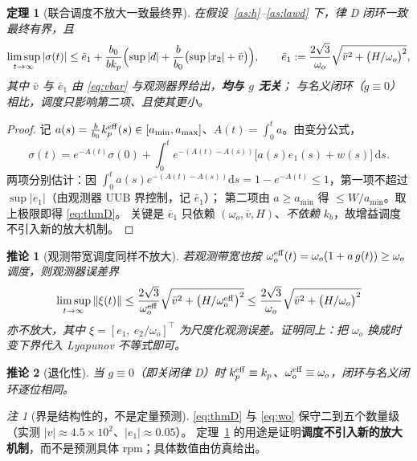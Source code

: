 \documentclass[11pt,a4paper]{article}
\newtheorem{theorem}{定理}
\newtheorem{corollary}{推论}
\theoremstyle{remark}
\newtheorem{remark}{注}
\begin{document}
\begin{theorem}[联合调度不放大一致最终界]\label{thm:lawd}
在假设~\ref{as:h}--\ref{as:lawd} 下，律 D 闭环一致最终有界，且
\begin{equation}
\limsup_{t\to\infty}|\sigma(t)|\le \bar e_1+\frac{b_0}{b k_p}\Bigl(\sup|d|+\frac{b}{b_0}\bigl(\sup|x_2|+\bar v\bigr)\Bigr),
\qquad
\bar e_1:=\frac{2\sqrt3}{\omega_o}\sqrt{\bar v^{2}+\bigl(H/\omega_o\bigr)^{2}},
\label{eq:thmD}
\end{equation}
其中 $\bar v$ 与 $\bar e_1$ 由 \eqref{eq:vbar} 与观测器界给出，\textbf{均与 $g$ 无关}；
与名义闭环（$g\equiv0$）相比，调度只影响第二项、且使其更小。
\end{theorem}
\begin{proof}
记 $a(s)=\frac{b}{b_0}k_p^{\rm eff}(s)\in[a_{\min},a_{\max}]$、$A(t)=\int_0^t a$。由变分公式，
\[
\sigma(t)=e^{-A(t)}\sigma(0)+\int_0^t e^{-(A(t)-A(s))}\bigl[a(s)e_1(s)+w(s)\bigr]\,\mathrm ds .
\]
两项分别估计：因 $\int_0^t a(s)e^{-(A(t)-A(s))}\mathrm ds=1-e^{-A(t)}\le1$，第一项不超过 $\sup|e_1|$（由观测器 UUB 界控制，记 $\bar e_1$）；
第二项由 $a\ge a_{\min}$ 得 $\le W/a_{\min}$。取上极限即得 \eqref{eq:thmD}。
关键是 $\bar e_1$ 只依赖 $(\omega_o,\bar v,H)$、\emph{不依赖} $k_b$，故增益调度不引入新的放大机制。
\end{proof}

\begin{corollary}[观测带宽调度同样不放大]\label{cor:kd}
若观测带宽也按 $\omega_o^{\rm eff}(t)=\omega_o(1+a\,g(t))\ge\omega_o$ 调度，则观测器误差界
\begin{equation}
\limsup_{t\to\infty}\|\xi(t)\|\le\frac{2\sqrt3}{\omega_o^{\rm eff}}\sqrt{\bar v^{2}+\bigl(H/\omega_o^{\rm eff}\bigr)^{2}}
\le\frac{2\sqrt3}{\omega_o}\sqrt{\bar v^{2}+\bigl(H/\omega_o\bigr)^{2}}
\label{eq:wo}
\end{equation}
亦不放大，其中 $\xi=[e_1,\ e_2/\omega_o]^{\top}$ 为尺度化观测误差。证明同上：把 $\omega_o$ 换成时变下界代入 Lyapunov 不等式即可。
\end{corollary}
\begin{corollary}[退化性]\label{cor:off}
当 $g\equiv0$（即关闭律 D）时 $k_p^{\rm eff}\equiv k_p$、$\omega_o^{\rm eff}\equiv\omega_o$，闭环与名义闭环逐位相同。
\end{corollary}
\begin{remark}[界是结构性的，不是定量预测]\label{rem:conservative}
\eqref{eq:thmD} 与 \eqref{eq:wo} 保守二到五个数量级（实测 $|v|\approx4.5\times10^{2}$、$|e_1|\approx0.05$）。
定理~\ref{thm:lawd} 的用途是证明\textbf{调度不引入新的放大机制}，而不是预测具体 rpm；具体数值由仿真给出。
\end{remark}
\end{document}
